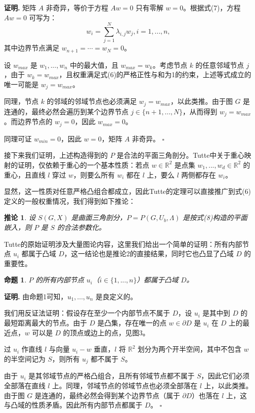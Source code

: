 \documentclass{ctexart}
\newtheorem{proposition}{命题}
\newtheorem{corollary}{推论}
\theoremstyle{proof}
\newenvironment{proof}{\noindent\textbf{证明.}}{\hfill$\square$\par}
\begin{document}
\begin{proof}
矩阵 $A$ 非奇异，等价于方程 $Aw=0$ 只有零解 $w=0$\cite{atkinson1989}。根据式(7)，方程 $Aw=0$ 可写为：
\[
w_{i}=\sum_{j=1}^{N} \lambda_{i, j} w_{j}, i=1, ..., n,
\]
其中边界节点满足 $w_{n+1}=\cdots=w_{N}=0$。

设 $w_{max}$ 是 $w_1,...,w_n$ 中的最大值，且 $w_{max}=w_k$。考虑节点 $k$ 的任意邻域节点 $j$，由于 $w_k=w_{max}$，且权重满足式(6)的严格正性与和为1的约束，上述等式成立的唯一可能是 $w_j=w_{max}$。

同理，节点 $k$ 的邻域的邻域节点也必须满足 $w_j=w_{max}$，以此类推。由于图 $G$ 是连通的，最终必然会遍历到某个边界节点 $j \in \{n+1,...,N\}$，从而得到 $w_j=w_{max}$。而边界节点的 $w_j=0$，因此 $w_{max}=0$。

同理可证 $w_{min}=0$，因此 $w=0$，矩阵 $A$ 非奇异。
\end{proof}

接下来我们证明，上述构造得到的 $P$ 是合法的平面三角剖分。Tutte\cite{tutte1963}中关于重心映射的证明，仅依赖于重心的一个基本性质：若点 $w \in \mathbb{R}^2$ 是点集 $w_1,...,w_d \in \mathbb{R}^2$ 的重心，且直线 $l$ 穿过 $w$，则要么所有 $w_i$ 都在 $l$ 上，要么 $l$ 两侧都存在 $w_i$。

显然，这一性质对任意严格凸组合都成立，因此Tutte的定理可以直接推广到式(6)定义的一般权重情况，我们得到如下推论：

\begin{corollary}
设 $S(G,X)$ 是曲面三角剖分，$P=P(G,U_b,\Lambda)$ 是按式(8)构造的平面嵌入，则 $P$ 是 $S$ 的合法参数化。
\end{corollary}

Tutte的原始证明涉及大量图论内容，这里我们给出一个简单的证明：所有内部节点 $u_i$ 都属于凸域 $D$，这一结论也是推论2的直接结果，同时它也凸显了凸域 $D$ 的重要性。

\begin{proposition}
$P$ 的所有内部节点 $u_i$（$i \in \{1,...,n\}$）都属于凸域 $D$。
\end{proposition}

\begin{proof}
由命题1可知，$u_1,...,u_n$ 是良定义的。

我们用反证法证明：假设存在至少一个内部节点不属于 $D$，设 $u_i$ 是其中到 $D$ 的最短距离最大的节点。由于 $D$ 是凸集，存在唯一的点 $w \in \partial D$ 是 $u_i$ 在 $D$ 上的最近点，$w$ 可以是 $D$ 的顶点或边上的点，见图3。

过 $u_i$ 作直线 $l$ 与向量 $u_i-w$ 垂直，$l$ 将 $\mathbb{R}^2$ 划分为两个开半空间，其中不包含 $w$ 的半空间记为 $S$，则所有 $u_j$ 都不属于 $S$。

由于 $u_i$ 是其邻域节点的严格凸组合，且所有邻域节点都不属于 $S$，因此它们必须全部落在直线 $l$ 上。同理，邻域节点的邻域节点也必须全部落在 $l$ 上，以此类推。由于图 $G$ 是连通的，最终必然会得到某个边界节点（属于 $\partial D$）也落在 $l$ 上，这与凸域的性质矛盾。因此所有内部节点都属于 $D$。
\end{proof}
\end{document}
